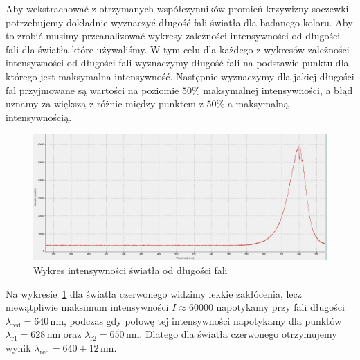 \documentclass[12pt]{article}
\begin{document}
Aby wekstrachować z otrzymanych współczynników promień krzywizny soczewki potrzebujemy dokładnie wyznaczyć długość fali światła dla badanego koloru. Aby to zrobić musimy przeanalizować wykresy zależności intensywności od długości fali dla światła które używaliśmy. W tym celu dla każdego z wykresów zależności intensywności od długości fali wyznaczymy długość fali na podstawie punktu dla którego jest maksymalna intensywność. Następnie wyznaczymy dla jakiej długości fal przyjmowane są wartości na poziomie \(50\%\) maksymalnej intensywności, a błąd uznamy za większą z różnic między punktem z \(50\%\) a maksymalną intensywnością.
\begin{figure}[H]
	\centering
	\includegraphics[scale=0.3]{red_wavelength}
	\caption{Wykres intensywności światła od długości fali}
	\label{fig:red_wavelength}
\end{figure}
Na wykresie~\ref{fig:red_wavelength} dla światła czerwonego widzimy lekkie zakłócenia, lecz niewątpliwie maksimum intensywności \(I \approx 60000\) napotykamy przy fali długości \(\lambda_{\mathrm{red}} = 640 \, \mathrm{nm}\), podczas gdy połowę tej intensywności napotykamy dla punktów \(\lambda_{\mathrm{r1}} = 628 \, \mathrm{nm}\) oraz \(\lambda_{\mathrm{r2}} = 650 \, \mathrm{nm}\). Dlatego dla światła czerwonego otrzymujemy wynik \(\lambda_{\mathrm{red}} = 640 \pm 12 \, \mathrm{nm}\).
\end{document}
